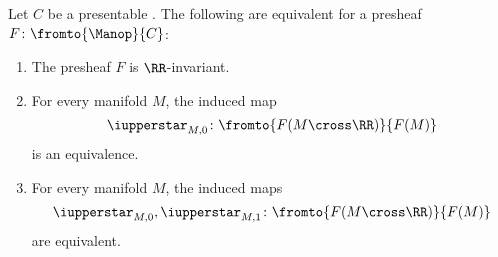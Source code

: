 \begin{proposition}\label{prop:differentRinvariance}
	Let $ C $ be a presentable \category.
	The following are equivalent for a presheaf $ F \colon \fromto{\Manop}{C} $:
	\begin{enumerate}
		\item\label{prop:differentRinvariance.1} The presheaf $ F $ is $ \RR $-invariant.

		\item\label{prop:differentRinvariance.2} For every manifold $ M $, the induced map
		\begin{equation*}
			\iupperstar_{M,0} \colon \fromto{F(M \cross \RR)}{F(M)} 
		\end{equation*}
		is an equivalence.

		\item\label{prop:differentRinvariance.3} For every manifold $ M $, the induced maps
		\begin{equation*}
			\iupperstar_{M,0}, \iupperstar_{M,1} \colon \fromto{F(M \cross \RR)}{F(M)} 
		\end{equation*}
		are equivalent.
	\end{enumerate}
\end{proposition}

